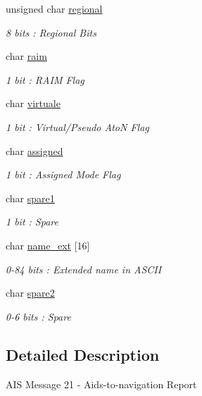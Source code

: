 \begin{DoxyCompactItemize}
unsigned char \mbox{\hyperlink{structaismsg__21_a8d5d01af9c60b44690eed9807971c190}{regional}}
\begin{DoxyCompactList}\small\item\em 8 bits \+: Regional Bits \end{DoxyCompactList}\item 
char \mbox{\hyperlink{structaismsg__21_ad53153647b762b51c770c02c61b9e173}{raim}}
\begin{DoxyCompactList}\small\item\em 1 bit \+: R\+A\+IM Flag \end{DoxyCompactList}\item 
char \mbox{\hyperlink{structaismsg__21_a25957600de676c7d6a60cb298527f56a}{virtuale}}
\begin{DoxyCompactList}\small\item\em 1 bit \+: Virtual/\+Pseudo AtoN Flag \end{DoxyCompactList}\item 
char \mbox{\hyperlink{structaismsg__21_a59e5ca53d6ace1f26e1e41d1376c47da}{assigned}}
\begin{DoxyCompactList}\small\item\em 1 bit \+: Assigned Mode Flag \end{DoxyCompactList}\item 
char \mbox{\hyperlink{structaismsg__21_a42943a66e673de57b63276e1e7c30719}{spare1}}
\begin{DoxyCompactList}\small\item\em 1 bit \+: Spare \end{DoxyCompactList}\item 
char \mbox{\hyperlink{structaismsg__21_aa432155ed79403ef9b950315bee182b8}{name\+\_\+ext}} \mbox{[}16\mbox{]}
\begin{DoxyCompactList}\small\item\em 0-\/84 bits \+: Extended name in A\+S\+C\+II \end{DoxyCompactList}\item 
char \mbox{\hyperlink{structaismsg__21_a39c9ffcc472c3cea6c6206434d6b334b}{spare2}}
\begin{DoxyCompactList}\small\item\em 0-\/6 bits \+: Spare \end{DoxyCompactList}\end{DoxyCompactItemize}


\subsection{Detailed Description}
A\+IS Message 21 -\/ Aids-\/to-\/navigation Report 

